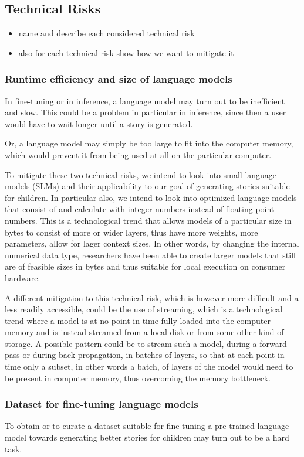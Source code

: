 \subsection{Technical Risks}


\begin{itemize}
    \item name and describe each considered technical risk 
    \item also for each technical risk show how we want to mitigate it
\end{itemize}

\subsubsection{Runtime efficiency and size of language models}

In fine-tuning or in inference, a language model may turn out to be inefficient and slow.
This could be a problem in particular in inference, since then a user would have to wait longer until a story is generated.

Or, a language model may simply be too large to fit into the computer memory, which would prevent it from being used at all on the particular computer.

To mitigate these two technical risks, we intend to look into small language models (SLMs) and their applicability to our goal of generating stories suitable for children.
In particular also, we intend to look into optimized language models that consist of and calculate with integer numbers instead of floating point numbers.
This is a technological trend that allows models of a particular size in bytes to consist of more or wider layers, thus have more weights, more parameters, allow for lager context sizes.
In other words, by changing the internal numerical data type, researchers have been able to create larger models that still are of feasible sizes in bytes and thus suitable for local execution on consumer hardware.

A different mitigation to this technical risk, which is however more difficult and a less readily accessible, could be the use of streaming, which is a technological trend where a model is at no point in time fully loaded into the computer memory and is instead streamed from a local disk or from some other kind of storage.
A possible pattern could be to stream such a model, during a forward-pass or during back-propagation, in batches of layers, so that at each point in time only a subset, in other words a batch, of layers of the model would need to be present in computer memory, thus overcoming the memory bottleneck.

\subsubsection{Dataset for fine-tuning language models}

To obtain or to curate a dataset suitable for fine-tuning a pre-trained language model towards generating better stories for children may turn out to be a hard task.


